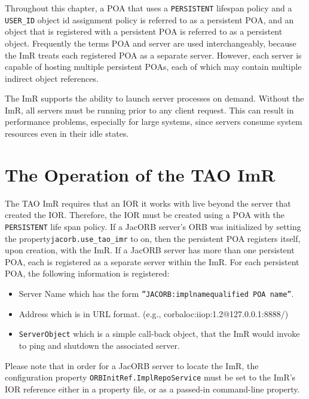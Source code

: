 Throughout this chapter, a POA that uses a {\tt PERSISTENT} lifespan
policy and  a {\tt USER_ID} object id assignment policy is referred to as
a persistent POA, and an object that is registered with a persistent POA is
referred to as a persistent object.  Frequently the terms POA and server are
used interchangeably, because the ImR treats each registered POA as a
separate server. However, each server is capable of hosting multiple
persistent POAs, each of which may contain multiple indirect object
references.

The ImR supports the ability to launch server processes on demand.
Without the ImR, all servers must be running prior to any client request.
This can result in performance problems, especially for large systems,
since servers consume system resources even in their idle states.

\section{The Operation of the TAO ImR}

The TAO ImR requires that an IOR it works with live beyond the server
that created the IOR. Therefore, the IOR must be created using a POA with
the {\tt PERSISTENT} life span policy. If a JacORB server’s ORB was
initialized by setting the property{\tt  jacorb.use\_tao\_imr} to on, then the
persistent POA registers itself, upon creation, with the ImR.  If a JacORB
server has more than one persistent POA, each is registered as a separate
server within the ImR. For each persistent POA, the following information
is registered:

\begin{itemize}
     \item Server Name which has the form
                {\tt ”JACORB:implname\/qualified POA name”}.
     \item Address which is in URL format.
              (e.g., corbaloc:iiop:1.2@127.0.0.1:8888/)
     \item {\tt ServerObject} which is a simple call-back object, that the
               ImR would invoke to ping and shutdown the associated server.
\end{itemize}

Please note that in order for a JacORB server to locate the ImR,
the configuration property {\tt ORBInitRef.ImplRepoService} must be set to
the ImR's IOR reference  either in a property file, or as a passed-in
command-line property.

